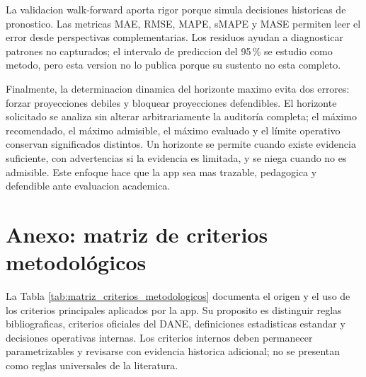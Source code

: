 ﻿\documentclass[12pt,letterpaper]{article}
\begin{document}
La validacion walk-forward aporta rigor porque simula decisiones historicas de pronostico. Las metricas MAE, RMSE, MAPE, sMAPE y MASE permiten leer el error desde perspectivas complementarias. Los residuos ayudan a diagnosticar patrones no capturados; el intervalo de prediccion del 95\,\% se estudio como metodo, pero esta version no lo publica porque su sustento no esta completo.

Finalmente, la determinacion dinamica del horizonte maximo evita dos errores: forzar proyecciones debiles y bloquear proyecciones defendibles. El horizonte solicitado se analiza sin alterar arbitrariamente la auditoría completa; el máximo recomendado, el máximo admisible, el máximo evaluado y el límite operativo conservan significados distintos. Un horizonte se permite cuando existe evidencia suficiente, con advertencias si la evidencia es limitada, y se niega cuando no es admisible. Este enfoque hace que la app sea mas trazable, pedagogica y defendible ante evaluacion academica.

\newpage
\section{Anexo: matriz de criterios metodológicos}
\label{sec:matriz_criterios_metodologicos}

La Tabla \ref{tab:matriz_criterios_metodologicos} documenta el origen y el uso de los criterios principales aplicados por la app. Su proposito es distinguir reglas bibliograficas, criterios oficiales del DANE, definiciones estadisticas estandar y decisiones operativas internas. Los criterios internos deben permanecer parametrizables y revisarse con evidencia historica adicional; no se presentan como reglas universales de la literatura.
\end{document}
